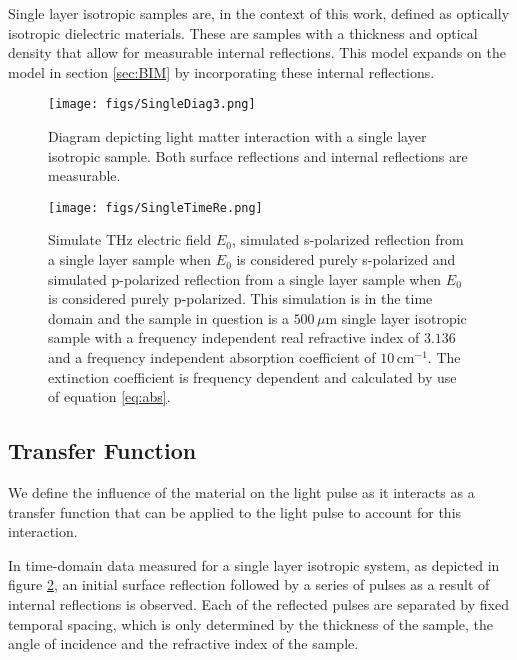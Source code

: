 Single layer isotropic samples are, in the context of this work, defined as  optically isotropic dielectric materials. These are samples with a thickness and optical density that allow for measurable internal reflections. This model expands on the model in section \ref{sec:BIM} by incorporating these internal reflections.

\begin{figure}[H]
\begin{center}
	 \texttt{[image: figs/SingleDiag3.png]}
	 \caption[Diagram of light-matter interaction with single layer isotropic sample]{Diagram depicting light matter interaction with a single layer isotropic sample. Both surface reflections and internal reflections are measurable.}
   \label{fig:SingleDiag}
\end{center}
\end{figure}

\begin{figure}[H]
\begin{center}
	 \texttt{[image: figs/SingleTimeRe.png]}
	 \caption[Simulated single layer isotropic example]{Simulate THz electric field $E_{0}$, simulated s-polarized reflection from a single layer sample when $E_{0}$ is considered purely s-polarized and simulated p-polarized reflection from a single layer sample when $E_{0}$ is considered purely p-polarized. This simulation is in the time domain and the sample in question is a $500\,\mu$m single layer isotropic sample with a frequency independent real refractive index of $3.136$ and a frequency independent absorption coefficient of $10\,\mbox{cm}^{-1}$. The extinction coefficient is frequency dependent and calculated by use of equation \ref{eq:abs}.}
   \label{fig:SingTime}
\end{center}
\end{figure}

\subsection{Transfer Function}
\label{sub: transp}
We define the influence of the material on the light pulse as it interacts as a transfer function that can be applied to the light pulse to account for this interaction.

In time-domain data measured for a single layer isotropic system, as depicted in figure \ref{fig:SingTime}, an initial surface reflection followed by a series of pulses as a result of internal reflections is observed. Each of the reflected pulses are separated by fixed temporal spacing, which is only determined by the thickness of the sample, the angle of incidence and the refractive index of the sample.

